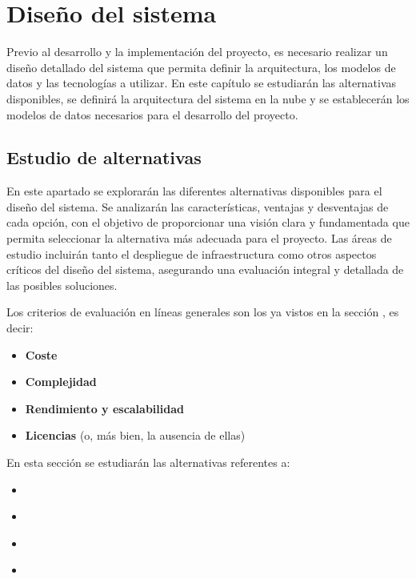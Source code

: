 \chapter{Diseño del sistema}\label{chap:diseño}
Previo al desarrollo y la implementación del proyecto, es necesario realizar un
diseño detallado del sistema que permita definir la arquitectura, los modelos de
datos y las tecnologías a utilizar. En este capítulo se estudiarán las
alternativas disponibles, se definirá la arquitectura del sistema en la nube y
se establecerán los modelos de datos necesarios para el desarrollo del proyecto.


\section{Estudio de alternativas}\label{sec:estudio}
En este apartado se explorarán las diferentes alternativas disponibles para el
diseño del sistema. Se analizarán las características, ventajas y desventajas de
cada opción, con el objetivo de proporcionar una visión clara y fundamentada que
permita seleccionar la alternativa más adecuada para el proyecto. Las áreas de
estudio incluirán tanto el despliegue de infraestructura como otros aspectos
críticos del diseño del sistema, asegurando una evaluación integral y detallada
de las posibles soluciones.

Los criterios de evaluación en líneas generales son los ya vistos en la sección
, es decir:

\begin{itemize}
	\item \textbf{Coste}
	\item \textbf{Complejidad}
	\item \textbf{Rendimiento y escalabilidad}
	\item \textbf{Licencias} (o, más bien, la ausencia de ellas)
\end{itemize}

En esta sección se estudiarán las alternativas referentes a:

\begin{itemize}
	\item \textbf{}
	\item \textbf{}
	\item \textbf{}
	\item \textbf{}
\end{itemize}


